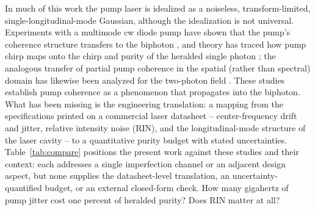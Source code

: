 In much of this work the pump laser is idealized as a noiseless,
transform-limited, single-longitudinal-mode Gaussian, although the
idealization is not universal. Experiments with a multimode cw diode
pump have shown that the pump's coherence structure transfers to the
biphoton \cite{kwon2009}, and theory has traced how pump chirp maps
onto the chirp and purity of the heralded single photon
\cite{sanchezlozano2012}; the analogous transfer of partial pump
coherence in the spatial (rather than spectral) domain has likewise
been analyzed for the two-photon field \cite{jha2010}. These studies
establish pump coherence as a phenomenon that propagates into the
biphoton. What has been missing is the engineering translation: a
mapping from the specifications printed on a commercial laser
datasheet -- center-frequency drift and jitter, relative intensity
noise (RIN), and the longitudinal-mode structure of the laser cavity
-- to a quantitative purity budget with stated uncertainties.
Table~\ref{tab:compare} positions the present work against these
studies and their context: each addresses a single imperfection
channel or an adjacent design aspect, but none supplies the
datasheet-level translation, an uncertainty-quantified budget, or
an external closed-form check. How many gigahertz of pump jitter cost
one percent of heralded purity? Does RIN matter at all?

\begin{table}[t]
\centering

\caption{Qualitative positioning relative to prior studies. Earlier
work established that individual pump imperfections -- bandwidth,
multimode structure, chirp, spatial coherence -- propagate into the
biphoton, and adjacent studies treated multi-pair statistics and
crystal-side apodization; this work adds the engineering layer
those studies leave open: a translation from printed datasheet lines
to model parameters, a purity budget with stated Monte-Carlo
uncertainties, and an external closed-form validation of the
numerical pipeline.}
\label{tab:compare}
\end{table}

